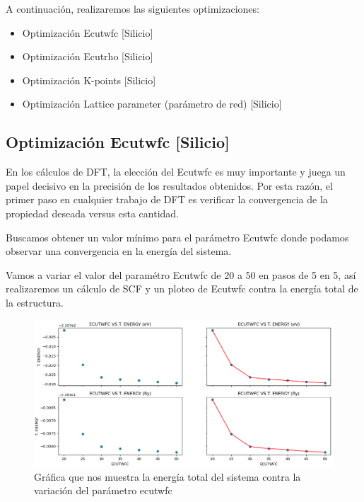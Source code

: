 A continuación, realizaremos las siguientes optimizaciones:

\begin{itemize}
    \item Optimización Ecutwfc [Silicio]
    \item Optimización Ecutrho [Silicio]
    \item Optimización K-points [Silicio]
    \item Optimización Lattice parameter (parámetro de red) [Silicio]
\end{itemize}

\newpage

\subsection{Optimización Ecutwfc [Silicio] }

En los cálculos de DFT, la elección del Ecutwfc es muy importante y juega un papel decisivo en la 
precisión de los resultados obtenidos. Por esta razón, el primer paso en cualquier trabajo de DFT es 
verificar la convergencia de la propiedad deseada versus esta cantidad.

Buscamos obtener un valor mínimo para el parámetro Ecutwfc donde podamos observar una convergencia en la 
energía del sistema.

\vspace{0.2cm}

Vamos a variar el valor del paramétro Ecutwfc de 20 a 50 en pasos de 5 en 5, así realizaremos un cálculo de
SCF y un ploteo de Ecutwfc contra la energía total de la estructura.

\vspace{0.1cm}

\begin{figure}[H]
    \centering
    \includegraphics[scale=0.36]{images/ecutwfc_vs_t_energy.png}
    \caption{Gráfica que nos muestra la energía total del sistema contra la variación del parámetro ecutwfc}
\end{figure}


